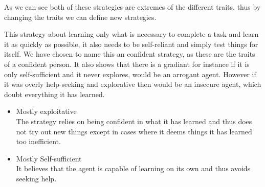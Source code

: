 \documentclass[../Master.tex]{subfiles}
\begin{document}
    As we can see both of these strategies are extremes of the different
    traits, thus by changing the traits we can define new strategies.
    \begin{example}
    [{Confident}] This strategy about learning only
    what is necessary to complete a task and learn it as quickly as possible,
    it also needs to be self-reliant and simply test things for itself. We have chosen to name this an confident strategy, as these are the traits of a confident person. It also shows that there is a gradiant for instance if it is only self-sufficient and it never explores, would be an arrogant agent. However if it was overly help-seeking and explorative then would be an insecure agent, which doubt everything it has learned.
    
    \begin{itemize}
    \item Mostly exploitative\\
    The strategy relies on being confident in what it has learned and
    thus does not try out new things except in cases where it deems things it has learned too inefficient.
    \item Mostly Self-sufficient\\
    It believes that the agent is capable of learning on its own and thus avoids seeking help.
    \end{itemize}

	\end{example}
\end{document}
